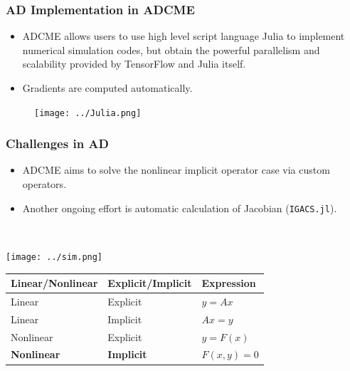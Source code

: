 \documentclass{beamer}
\begin{document}
\begin{frame}
	\frametitle{AD Implementation in ADCME}
	\begin{itemize}
		\item ADCME allows users to use high level script language Julia to implement numerical simulation codes, but obtain the powerful parallelism and scalability provided by TensorFlow and Julia itself.
		\item Gradients are computed automatically. 
	\end{itemize}
	\begin{figure}[hbt]
  \texttt{[image: ../Julia.png]}
\end{figure}
\end{frame}

\begin{frame}
	\frametitle{Challenges in AD}
	
	
	\begin{minipage}[t]{0.49\textwidth}
	\vspace{-3cm}
\begin{itemize}
	\item ADCME aims to solve the nonlinear implicit operator case via custom operators. 
	\item Another ongoing effort is automatic calculation of Jacobian (\texttt{IGACS.jl}).
\end{itemize}
\end{minipage}~
\begin{minipage}[t]{0.49\textwidth}
  \texttt{[image: ../sim.png]}
\end{minipage}

\begin{table}[]
\begin{tabular}{@{}lll@{}}
\toprule
Linear/Nonlinear & Explicit/Implicit & Expression   \\ \midrule
Linear           & Explicit          & $y=Ax$       \\
Linear           & Implicit          & $Ax = y$     \\
Nonlinear        & Explicit          & $y = F(x)$   \\
\textbf{Nonlinear}        & \textbf{Implicit}          & $F(x,y) = 0$ \\ \bottomrule
\end{tabular}
\end{table}






\end{frame}
\end{document}
